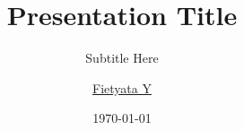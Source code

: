 \title{Presentation Title}
\subtitle{Subtitle Here}
\author{\href{mailto:fietyatayudha@gmail.com}{Fietyata Y}}
\date{\today}

